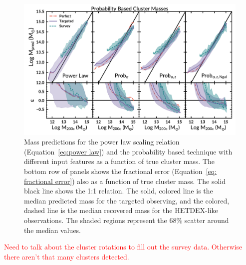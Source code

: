 \documentclass[fleqn,usenatbib]{mnras}
\newcommand{\editorial}[1]{\textcolor{red}{#1}}
\begin{document}
\begin{figure} 
	\includegraphics[width=\textwidth]{figures/Probcomparison.pdf} 
	\caption{Mass predictions for the power law scaling relation (Equation~\ref{eq:power law}) and the probability based technique with different input features as a function of true cluster mass. The bottom row of panels shows the fractional error (Equation~\ref{eq: fractional error}) also as a function of true cluster mass. The solid black line shows the 1:1 relation. The solid, colored line is the median predicted mass for the targeted observing, and the colored, dashed line is the median recovered mass for the HETDEX-like observations. The shaded regions represent the 68\% scatter around the median values.} \label{fig:Probability comparison} 
\end{figure}

\editorial{Need to talk about the cluster rotations to fill out the survey data. Otherwise there aren't that many clusters detected.}
\end{document}
